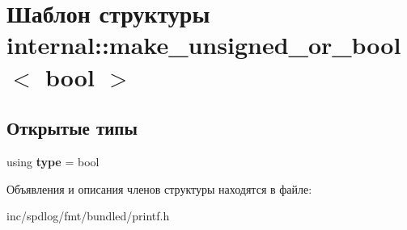 \hypertarget{structinternal_1_1make__unsigned__or__bool_3_01bool_01_4}{}\section{Шаблон структуры internal\+:\+:make\+\_\+unsigned\+\_\+or\+\_\+bool$<$ bool $>$}
\label{structinternal_1_1make__unsigned__or__bool_3_01bool_01_4}
\subsection*{Открытые типы}
\begin{DoxyCompactItemize}
\item 
\mbox{\label{structinternal_1_1make__unsigned__or__bool_3_01bool_01_4_a64615a2bd9ebfc6d57d0241762bfc502}} 
using {\bfseries type} = bool
\end{DoxyCompactItemize}


Объявления и описания членов структуры находятся в файле\+:\begin{DoxyCompactItemize}
\item 
inc/spdlog/fmt/bundled/printf.\+h\end{DoxyCompactItemize}
